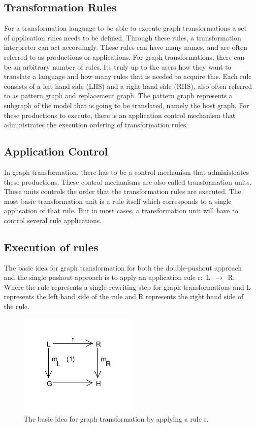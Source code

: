 \subsection{Transformation Rules}
For a transformation language to be able to execute graph
transformations a set of application rules needs to be defined. Through these
rules, a transformation interpreter can act accordingly. These rules can have
many names, and are often referred to as productions or applications. For graph
transformations, there can be an arbitrary number of rules. Its truly up to the
users how they want to translate a language and how many rules that is needed
to acquire this. Each rule consists of a left hand side (LHS) and a right hand
side (RHS), also often referred to as pattern graph and replacement graph. The
pattern graph represents a subgraph of the model that is going to be translated,
namely the host graph. For these productions to execute, there is an application
control mechanism that administrates the execution ordering of transformation
rules. 

\subsection{Application Control}
In graph transformation, there has to be a control mechanism that
administrates these productions. These control mechanisms are also called
transformation units. These units controls the order that the transformation
rules are executed. The most basic transformation unit is a rule itself which
corresponds to a single application of that rule. But in most cases, a
transformation unit will have to control several rule applications. 

\subsection{Execution of rules}
The basic idea for graph transformation for both the double-pushout
approach and the single pushout approach is to apply an application rule
\mbox{r: L $\longrightarrow$ R}. Where the rule represents a single rewriting
step for graph transformations and L represents the left hand side of the rule and R
represents the right hand side of the rule.

\begin{figure}[H]
	\centering
	\includegraphics[scale=0.7]{./Figures/Single_Pushout.png}
	\caption[Idea of graph transformation]
	{The basic idea for graph transformation by applying a rule r.}
	\label{fig:GraphTransformationGeneral}
\end{figure}

